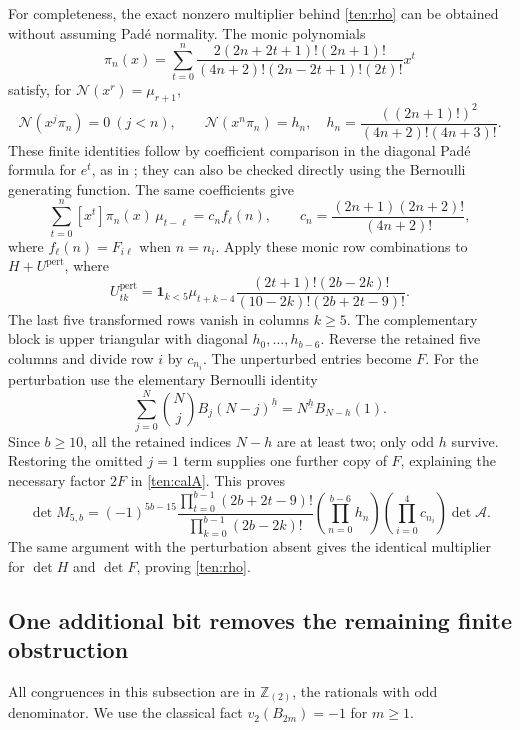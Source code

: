 For completeness, the exact nonzero multiplier behind
\eqref{ten:rho} can be obtained without assuming Pad\'e normality.
The monic polynomials
\[
 \pi_n(x)=\sum_{t=0}^{n}
 \frac{2(2n+2t+1)!(2n+1)!}
 {(4n+2)!(2n-2t+1)!(2t)!}x^t
\]
satisfy, for $\mathcal N(x^r)=\mu_{r+1}$,
\[
 \mathcal N(x^j\pi_n)=0\ (j<n),\qquad
 \mathcal N(x^n\pi_n)=h_n,
 \quad h_n=\frac{((2n+1)!)^2}{(4n+2)!(4n+3)!}.
\]
These finite identities follow by coefficient comparison in the
diagonal Pad\'e formula for $e^t$, as in \cite{QuarticIncoming}; they
can also be checked directly using the Bernoulli generating function.
The same coefficients give
\[
 \sum_{t=0}^{n}[x^t]\pi_n(x)\,\mu_{t-\ell}
 =c_n f_\ell(n),\qquad
 c_n=\frac{(2n+1)(2n+2)!}{(4n+2)!},
\]
where $f_\ell(n)=F_{i\ell}$ when $n=n_i$.
Apply these monic row combinations to
$H+U^{\mathrm{pert}}$, where
\[
 U^{\mathrm{pert}}_{tk}
 =\mathbf1_{k<5}\mu_{t+k-4}
 \frac{(2t+1)!(2b-2k)!}{(10-2k)!(2b+2t-9)!}.
\]
The last five transformed rows vanish in columns $k\ge5$.
The complementary block is upper triangular with diagonal
$h_0,\ldots,h_{b-6}$.  Reverse the retained five columns and
divide row $i$ by $c_{n_i}$.  The unperturbed entries become $F$.
For the perturbation use the elementary Bernoulli identity
\[
 \sum_{j=0}^{N}\binom Nj B_j(N-j)^{\underline h}
       =N^{\underline h}B_{N-h}(1).
\]
Since $b\ge10$, all the retained indices $N-h$ are at least two;
only odd $h$ survive.  Restoring the omitted $j=1$ term supplies
one further copy of $F$, explaining the necessary factor $2F$
in \eqref{ten:calA}.  This proves
\begin{equation}\label{ten:multiplier}
 \det M_{5,b}=(-1)^{5b-15}
 \frac{\prod_{t=0}^{b-1}(2b+2t-9)!}
      {\prod_{k=0}^{b-1}(2b-2k)!}
 \left(\prod_{n=0}^{b-6}h_n\right)
 \left(\prod_{i=0}^{4}c_{n_i}\right)\det\mathcal A.
\end{equation}
The same argument with the perturbation absent gives the identical
multiplier for $\det H$ and $\det F$, proving \eqref{ten:rho}.

\subsection{One additional bit removes the remaining finite obstruction}

All congruences in this subsection are in $\mathbb Z_{(2)}$,
the rationals with odd denominator.  We use the classical fact
$v_2(B_{2m})=-1$ for $m\ge1$.

